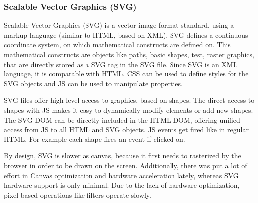 \subsubsection{Scalable Vector Graphics (SVG)}
\label{sec:svg}

Scalable Vector Graphics (SVG) is a vector image format standard, using a markup language (similar to HTML, based on XML).
SVG defines a continuous coordinate system, on which mathematical constructs are defined on.
This mathematical constructs are objects like paths, basic shapes, test, raster graphics, that are directly stored as a SVG tag in the SVG file.
Since SVG is an XML language, it is comparable with HTML.
CSS can be used to define styles for the SVG objects and JS can be used to manipulate properties.

SVG files offer high level access to graphics, based on shapes.
The direct access to shapes with JS makes it easy to dynamically modify elements or add new shapes.
The SVG DOM can be directly included in the HTML DOM, offering unified access from JS to all HTML and SVG objects.
JS events get fired like in regular HTML.
For example each shape fires an  event if clicked on.


By design, SVG is slower as canvas, because it first needs to rasterized by the browser in order to be drawn on the screen.
Additionally, there was put a lot of effort in Canvas optimization and hardware acceleration lately, whereas SVG hardware support is only minimal.
Due to the lack of hardware optimization, pixel based operations like filters operate slowly.






